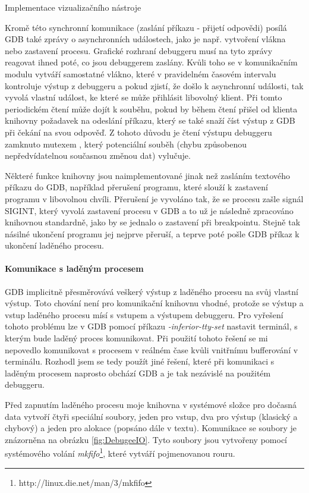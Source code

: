 \documentclass[czech,bachelor,male,python,dept460,hidelinks]{diploma}						%
\newcommand{\parspace}[1][]{
	\ifthenelse{\isempty{#1}}{\vspace{5mm}}{\vspace{#1}}
	\par
}
\begin{document}
\begin{section}{Implementace vizualizačního nástroje}
			\parspace Kromě této synchronní komunikace (zaslání příkazu - přijetí odpovědi) posílá GDB také zprávy o asynchronních událostech, jako je např.
			vytvoření vlákna nebo zastavení procesu. Grafické rozhraní debuggeru musí na tyto zprávy reagovat ihned poté, co jsou debuggerem zaslány.
			Kvůli toho se v komunikačním modulu vytváří samostatné vlákno, které v pravidelném časovém intervalu kontroluje výstup z debuggeru a pokud zjistí, že došlo
			k asynchronní události, tak vyvolá vlastní událost, ke které se může přihlásit libovolný klient. Při tomto periodickém čtení může dojít k souběhu, pokud
			by během čtení přišel od klienta knihovny požadavek na odeslání příkazu, který se také snaží číst výstup z GDB při čekání na svou odpověď.
			Z tohoto důvodu je čtení výstupu debuggeru zamknuto mutexem \cite[80]{tanenbaum}, který potenciální souběh (chybu způsobenou nepředvídatelnou
			současnou změnou dat) vylučuje.
			
			\parspace Některé funkce knihovny jsou naimplementované jinak než zasláním textového příkazu do GDB, například přerušení programu, které
			slouží k zastavení programu v libovolnou chvíli. Přerušení je vyvoláno tak, že se procesu zašle signál SIGINT, který vyvolá zastavení procesu v GDB a to
			už je následně zpracováno knihovnou standardně, jako by se jednalo o zastavení při breakpointu. Stejně tak násilné ukončení programu jej nejprve přeruší,
			a teprve poté pošle GDB příkaz k ukončení laděného procesu.
			
		\paragraph*{Komunikace s laděným procesem}
			GDB implicitně přesměrovává veškerý výstup z laděného procesu na svůj vlastní výstup. Toto chování není pro komunikační knihovnu vhodné,
			protože se výstup a vstup laděného procesu mísí s vstupem a výstupem debuggeru.
			Pro vyřešení tohoto problému lze v GDB pomocí příkazu \textit{-inferior-tty-set} nastavit terminál, s kterým bude laděný proces komunikovat.
			Při použití tohoto řešení se mi nepovedlo komunikovat s procesem v reálném čase kvůli vnitřnímu bufferování v terminálu.
			Rozhodl jsem se tedy použít jiné řešení, které při komunikaci s laděným procesem naprosto obchází GDB a je tak nezávislé na použitém debuggeru.
			
			\parspace Před zapnutím laděného procesu moje knihovna v systémové složce pro dočasná data vytvoří čtyři speciální soubory, jeden pro vstup, dva pro výstup
			(klasický a chybový) a jeden pro alokace (popsáno dále v textu). Komunikace se soubory je znázorněna na obrázku \ref{fig:DebugeeIO}.
			Tyto soubory jsou vytvořeny pomocí systémového volání \textit{mkfifo}\footnote{http://linux.die.net/man/3/mkfifo}, které vytváří pojmenovanou rouru.
			

\end{section}
\end{document}

